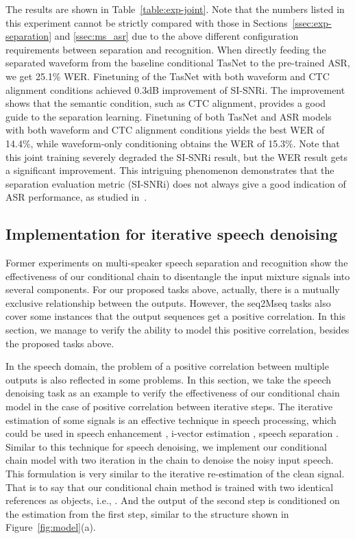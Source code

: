 \documentclass{article}
\begin{document}
The results are shown in Table~\ref{table:exp-joint}.
Note that the numbers listed in this experiment cannot be strictly compared with those in Sections~\ref{ssec:exp-separation} and \ref{ssec:ms_asr} due to the above different configuration requirements between separation and recognition.
When directly feeding the separated waveform from the baseline conditional TasNet to the pre-trained ASR, we get 25.1\% WER. Finetuning of the TasNet with both waveform and CTC alignment conditions achieved 0.3dB improvement of SI-SNRi.
The improvement shows that the semantic condition, such as CTC alignment, provides a good guide to the separation learning. 
Finetuning of both TasNet and ASR models with both waveform and CTC alignment conditions yields the best WER of 14.4\%, while waveform-only conditioning obtains the WER of 15.3\%.
Note that this joint training severely degraded the SI-SNRi result, but the WER result gets a significant improvement. This intriguing phenomenon demonstrates that the separation evaluation metric (SI-SNRi) does not always give a good indication of ASR performance, as studied in~\cite{subramanian2019speech,subramanian2020far}.





\subsection{Implementation for iterative speech denoising\label{appendix:dns}}

Former experiments on multi-speaker speech separation and recognition show the effectiveness of our conditional chain to disentangle the input mixture signals into several components. For our proposed tasks above, actually, there is a mutually exclusive relationship between the outputs. 
However, the seq2Mseq tasks also cover some instances that the output sequences get a positive correlation. In this section, we manage to verify the ability to model this positive correlation, besides the proposed tasks above. 

In the speech domain, the problem of a positive correlation between multiple outputs is also reflected in some problems. In this section, we take the speech denoising task as an example to verify the effectiveness of our conditional chain model in the case of positive correlation between iterative steps.
The iterative estimation of some signals is an effective technique in speech processing, which could be used in speech enhancement \cite{gannot1998iterative}, i-vector estimation \cite{medennikov2020target}, speech separation \cite{Kolbaek2017Multitalker}. Similar to this technique for speech denoising, we implement our conditional chain model with two iteration in the chain to denoise the noisy input speech. This formulation is very similar to the iterative re-estimation of the clean signal. That is to say that our conditional chain method is trained with two identical references as objects, i.e., .  And the output of the second step is conditioned on the estimation from the first step, similar to the structure shown in Figure~\ref{fig:model}(a).
\end{document}
